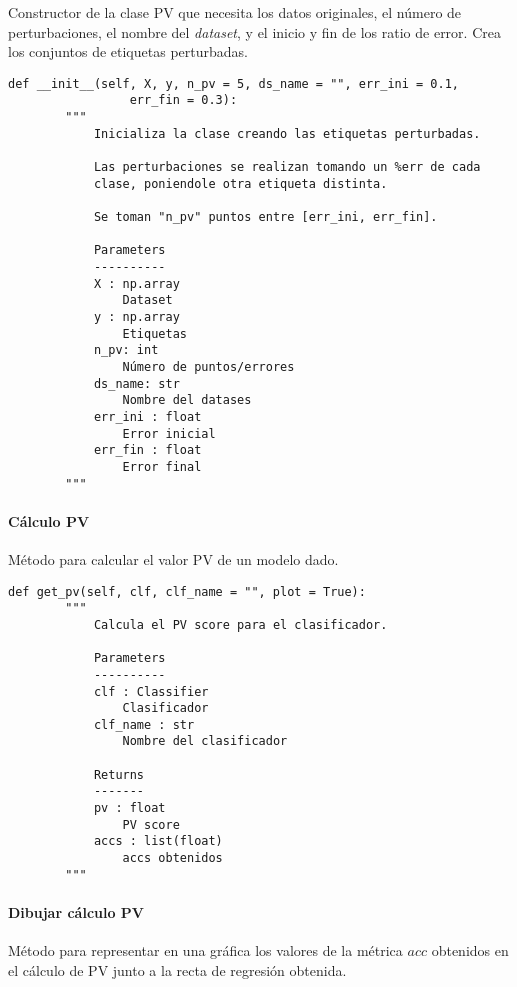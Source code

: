 Constructor de la clase PV que necesita los datos originales, el número de perturbaciones, el nombre del \emph{dataset}, y el inicio y fin de los ratio de error. Crea los conjuntos de etiquetas perturbadas.

\begin{lstlisting}
def __init__(self, X, y, n_pv = 5, ds_name = "", err_ini = 0.1,
                 err_fin = 0.3):
        """
            Inicializa la clase creando las etiquetas perturbadas.

            Las perturbaciones se realizan tomando un %err de cada
            clase, poniendole otra etiqueta distinta.

            Se toman "n_pv" puntos entre [err_ini, err_fin].

            Parameters
            ----------
            X : np.array
                Dataset
            y : np.array
                Etiquetas
            n_pv: int
                Número de puntos/errores
            ds_name: str
                Nombre del datases
            err_ini : float
                Error inicial
            err_fin : float
                Error final
        """
\end{lstlisting}

\paragraph{Cálculo PV}

Método para calcular el valor PV de un modelo dado.

\begin{lstlisting}
def get_pv(self, clf, clf_name = "", plot = True):
        """
            Calcula el PV score para el clasificador.

            Parameters
            ----------
            clf : Classifier
                Clasificador
            clf_name : str
                Nombre del clasificador

            Returns
            -------
            pv : float
                PV score
            accs : list(float)
                accs obtenidos
        """
\end{lstlisting}

\paragraph{Dibujar cálculo PV}

Método para representar en una gráfica los valores de la métrica $acc$ obtenidos en el cálculo de PV junto a la recta de regresión obtenida.

